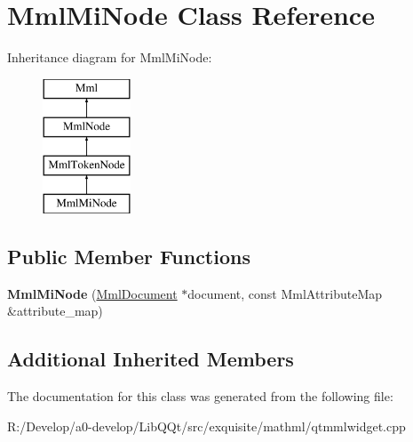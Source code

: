 \hypertarget{class_mml_mi_node}{}\section{Mml\+Mi\+Node Class Reference}
\label{class_mml_mi_node}
Inheritance diagram for Mml\+Mi\+Node\+:\begin{figure}[H]
\begin{center}
\leavevmode
\includegraphics[height=4.000000cm]{class_mml_mi_node}
\end{center}
\end{figure}
\subsection*{Public Member Functions}
\begin{DoxyCompactItemize}
\item 
\mbox{\label{class_mml_mi_node_a1c4d873443f092e5bfcc8064ce195a27}} 
{\bfseries Mml\+Mi\+Node} (\mbox{\hyperlink{class_mml_document}{Mml\+Document}} $\ast$document, const Mml\+Attribute\+Map \&attribute\+\_\+map)
\end{DoxyCompactItemize}
\subsection*{Additional Inherited Members}


The documentation for this class was generated from the following file\+:\begin{DoxyCompactItemize}
\item 
R\+:/\+Develop/a0-\/develop/\+Lib\+Q\+Qt/src/exquisite/mathml/qtmmlwidget.\+cpp\end{DoxyCompactItemize}
